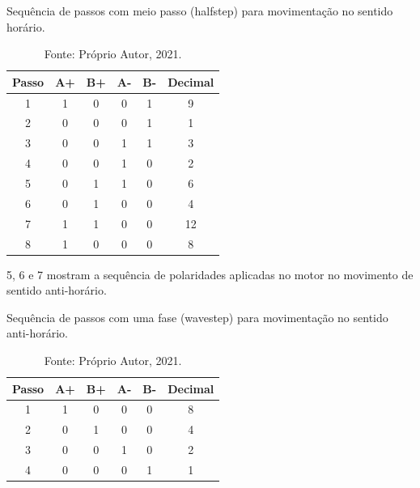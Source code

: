 \begin{table}
    \centering
    \caption{Sequência de passos com meio passo (halfstep) para movimentação no sentido horário.}
    \begin{tabular}{cccccc}
        \hline
        \textbf{Passo} & \textbf{A+} & \textbf{B+} & \textbf{A-} & \textbf{B-} & \textbf{Decimal}\\
        \hline
        1 & 1 & 0 & 0 & 1 & 9\\
        2 & 0 & 0 & 0 & 1 & 1\\
        3 & 0 & 0 & 1 & 1 & 3\\
        4 & 0 & 0 & 1 & 0 & 2\\
        5 & 0 & 1 & 1 & 0 & 6\\
        6 & 0 & 1 & 0 & 0 & 4\\
        7 & 1 & 1 & 0 & 0 & 12\\
        8 & 1 & 0 & 0 & 0 & 8\\
        \hline       
    \end{tabular}
    \caption*{Fonte: Próprio Autor, 2021.}
    \label{tab:halfstephorario}
\end{table}

5, 6 e 7 mostram a sequência de polaridades aplicadas no motor no movimento de sentido anti-horário.

\begin{table}
    \centering
    \caption{Sequência de passos com uma fase (wavestep) para movimentação no sentido anti-horário.}
    \begin{tabular}{cccccc}
        \hline
        \textbf{Passo} & \textbf{A+} & \textbf{B+} & \textbf{A-} & \textbf{B-} & \textbf{Decimal}\\
        \hline
        1 & 1 & 0 & 0 & 0 & 8\\
        2 & 0 & 1 & 0 & 0 & 4\\
        3 & 0 & 0 & 1 & 0 & 2\\
        4 & 0 & 0 & 0 & 1 & 1\\
        \hline       
    \end{tabular}
    \caption*{Fonte: Próprio Autor, 2021.}
    \label{tab:wavestepantihorario}
\end{table}

